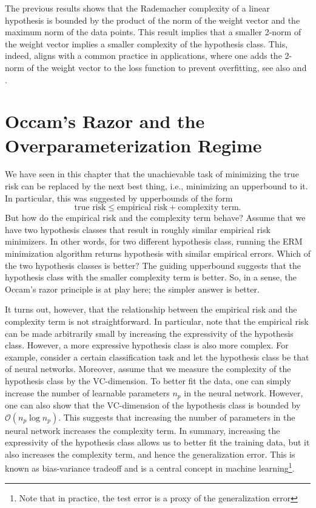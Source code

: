 \begin{rmk}
The previous results shows that the Rademacher complexity of a linear hypothesis
is bounded by the product of the norm of the weight vector and the maximum norm
of the data points. This result implies that a smaller 2-norm of the weight
vector implies a smaller complexity of the hypothesis class. This, indeed,
aligns with a common practice in applications, where one adds the 2-norm of the
weight vector to the loss function to prevent overfitting, see also
 and .
\end{rmk}
\section{Occam's Razor and the Overparameterization Regime}
We have seen in this chapter that the unachievable task of minimizing the true
risk can be replaced by the next best thing, i.e., minimizing an upperbound to
it. In particular, this was suggested by upperbounds of the form
$$
\text{true risk} \leq \text{empirical risk} + \text{complexity term}.
$$
But how do the empirical risk and the complexity term behave? Assume that we
have two hypothesis classes that result in roughly similar empirical risk
minimizers. In other words, for two different hypothesis class, running the ERM
minimization algorithm returns hypothesis with similar empirical errors. Which
of the two hypothesis classes is better? The guiding upperbound suggests that
the hypothesis class with the smaller complexity term is better. So, in a sense,
the Occam's razor principle is at play here; the simpler answer is better. 

It turns out, however, that the relationship between the empirical risk and the
complexity term is not straightforward. In particular, note that the empirical
risk can be made arbitrarily small by increasing the expressivity of the
hypothesis class. However, a more expressive hypothesis class is also more
complex. For example, consider a certain classification task and let the
hypothesis class be that of neural networks. Moreover, assume that we measure
the complexity of the hypothesis class by the VC-dimension. To better fit the
data, one can simply increase the number of learnable parameters $n_p$ in the neural
network. However, one can also show that the VC-dimension of the hypothesis
class is bounded by $\mathcal{O}(n_p \log n_p)$. This suggests that increasing
the number of parameters in the neural network increases the complexity term. In
summary, increasing the expressivity of the hypothesis class allows us to better
fit the training data, but it also increases the complexity term, and hence the
generalization error. This is known as bias-variance tradeoff and is a central
concept in machine learning\footnote{Note that in practice, the test error is a
proxy of the generalization error}.

